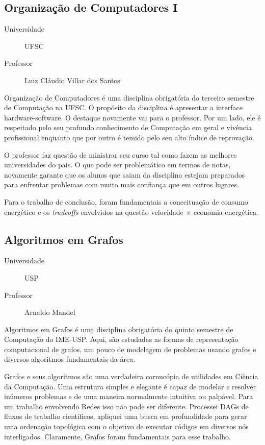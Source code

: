 \subsection{Organização de Computadores I}
\begin{description}
	\item[Universidade] UFSC
	\item[Professor] Luiz Cláudio Villar dos Santos
\end{description}

Organização de Computadores é uma disciplina obrigatória do terceiro semestre de
Computação na UFSC. O propósito da disciplina é apresentar a interface 
hardware-software. O destaque novamente vai para o professor.
Por um lado, ele é respeitado pelo seu profundo conhecimento de Computação em
geral e vivência profissional enquanto que por outro é temido pelo seu alto
índice de reprovação.

O professor faz questão de ministrar seu curso tal como fazem as melhores
universidades do país. O que pode ser problemático em termos de notas, 
novamente garante que os alunos que saiam da disciplina estejam preparados para
enfrentar problemas com muito mais confiança que em outros lugares.

Para o trabalho de conclusão, foram fundamentais a conceituação de consumo
energético e os \emph{tradeoffs} envolvidos na questão velocidade $\times$ 
economia energética. 

\subsection{Algoritmos em Grafos}
\begin{description}
	\item[Universidade] USP
	\item[Professor] Arnaldo Mandel
\end{description}

Algoritmos em Grafos é uma disciplina obrigatória do quinto semestre de
Computação do IME-USP. Aqui, são estudadas as formas de representação
computacional de grafos, um pouco de modelagem de problemas usando grafos e 
diversos algoritmos fundamentais da área.

Grafos e seus algoritmos são uma verdadeira cornucópia de utilidades em Ciência
da Computação. Uma estrutura simples e elegante é capaz de modelar e resolver
inúmeros problemas e de uma maneira normalmente intuitiva ou palpável. Para
um trabalho envolvendo Redes isso não pode ser diferente. Processei DAGs de
fluxos de trabalho científicos, apliquei uma busca em profundidade para 
gerar uma ordenação topológica com o objetivo de executar códigos em diversos nós 
interligados. Claramente, Grafos foram fundamentais para esse trabalho.

